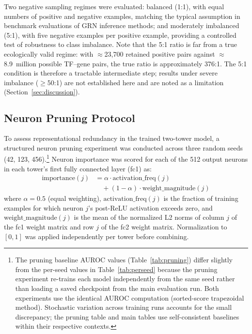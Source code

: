 \documentclass[journal]{IEEEtran}
\begin{document}
Two negative sampling regimes were evaluated: balanced (1:1), with equal
numbers of positive and negative examples, matching the typical assumption in
benchmark evaluations of GRN inference methods; and moderately imbalanced
(5:1), with five negative examples per positive example, providing a
controlled test of robustness to class imbalance. Note that the 5:1 ratio is
far from a true ecologically valid regime: with $\approx$23,700 retained
positive pairs against $\approx$8.9~million possible TF--gene pairs, the
true ratio is approximately 376:1. The 5:1 condition is therefore a
tractable intermediate step; results under severe imbalance
(${\geq}$50:1) are not established here and are noted as a limitation
(Section~\ref{sec:discussion}).

\subsection{Neuron Pruning Protocol}
\label{ssec:pruning}

To assess representational redundancy in the trained two-tower model, a
structured neuron pruning experiment was conducted across three random seeds
(42, 123, 456).\footnote{The pruning baseline AUROC values
(Table~\ref{tab:pruning}) differ slightly from the per-seed values in
Table~\ref{tab:perseed} because the pruning experiment re-trains each model
independently from the same seed rather than loading a saved checkpoint from
the main evaluation run. Both experiments use the identical AUROC computation
(sorted-score trapezoidal method). Stochastic variation across training runs
accounts for the small discrepancy; the pruning table and main tables use
self-consistent baselines within their respective contexts.}
Neuron importance was scored for each of the 512 output neurons
in each tower's first fully connected layer (fc1) as:
%
\begin{align}
  \text{importance}(j) &= \alpha \cdot \text{activation\_freq}(j) \nonumber \\
                       &\quad + (1 - \alpha) \cdot \text{weight\_magnitude}(j)
\end{align}
%
where $\alpha = 0.5$ (equal weighting), $\text{activation\_freq}(j)$ is the
fraction of training examples for which neuron $j$'s post-ReLU activation
exceeds zero, and $\text{weight\_magnitude}(j)$ is the mean of the normalized
L2 norms of column $j$ of the fc1 weight matrix and row $j$ of the fc2 weight
matrix. Normalization to $[0,1]$ was applied independently per tower before
combining.
\end{document}
